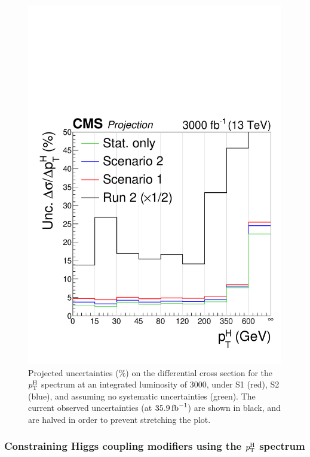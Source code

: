 \begin{figure}[hbtp]
  \begin{center}
    \includegraphics[width=0.49\linewidth]{img/projections/hllhc-pth-unc-scenarios.pdf}
    \caption{
        Projected uncertainties (\%) on the differential cross section for the $p_\mathrm{T}^\mathrm{H}$ spectrum at an integrated luminosity of 3000\fbinv, under S1 (red), S2 (blue), and assuming no systematic uncertainties (green).
        The current observed uncertainties (at $35.9\,\text{fb}^{-1}$) are shown in black, and are halved in order to prevent stretching the plot.
        }
    \label{fig:hllhc-pth-unc-scenarios}
  \end{center}
\end{figure}


\subsubsection{Constraining Higgs coupling modifiers using the \texorpdfstring{$p_\mathrm{T}^\mathrm{H}$}{pTH} spectrum}

